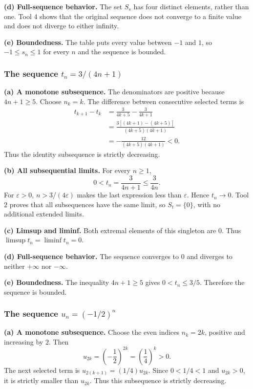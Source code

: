 \textbf{(d) Full-sequence behavior.}
The set $S_s$ has four distinct elements, rather than one.
Tool 4 shows that the original sequence does not converge
to a finite value and does not diverge to either infinity.

\textbf{(e) Boundedness.}
The table puts every value between $-1$ and $1$, so
$-1\leq s_n\leq1$ for every $n$ and the sequence is bounded.

\subsubsection*{The sequence $t_n=3/(4n+1)$}

\textbf{(a) A monotone subsequence.}
The denominators are positive because $4n+1\geq5$.
Choose $n_k=k$. The difference between consecutive selected
terms is
\begin{align*}
 t_{k+1}-t_k
 &=\frac3{4k+5}-\frac3{4k+1}\\
 &=\frac{3[(4k+1)-(4k+5)]}{(4k+5)(4k+1)}\\
 &=-\frac{12}{(4k+5)(4k+1)}<0.
\end{align*}
Thus the identity subsequence is strictly decreasing.

\textbf{(b) All subsequential limits.}
For every $n\geq1$,
\[
 0<t_n=\frac3{4n+1}\leq\frac3{4n}.
\]
For $\varepsilon>0$, $n>3/(4\varepsilon)$ makes the
last expression less than $\varepsilon$. Hence $t_n\to0$.
Tool 2 proves that all subsequences have the same limit,
so $S_t=\{0\}$, with no additional extended limits.

\textbf{(c) Limsup and liminf.}
Both extremal elements of this singleton are $0$.
Thus $\limsup t_n=\liminf t_n=0$.

\textbf{(d) Full-sequence behavior.}
The sequence converges to $0$ and diverges to neither
$+\infty$ nor $-\infty$.

\textbf{(e) Boundedness.}
The inequality $4n+1\geq5$ gives
$0<t_n\leq3/5$. Therefore the sequence is bounded.

\subsubsection*{The sequence $u_n=(-1/2)^n$}

\textbf{(a) A monotone subsequence.}
Choose the even indices $n_k=2k$, positive and increasing
by $2$. Then
\[
 u_{2k}=\left(-\frac12\right)^{2k}
 =\left(\frac14\right)^k>0.
\]
The next selected term is $u_{2(k+1)}=(1/4)u_{2k}$.
Since $0<1/4<1$ and $u_{2k}>0$, it is strictly smaller
than $u_{2k}$. Thus this subsequence is strictly decreasing.

